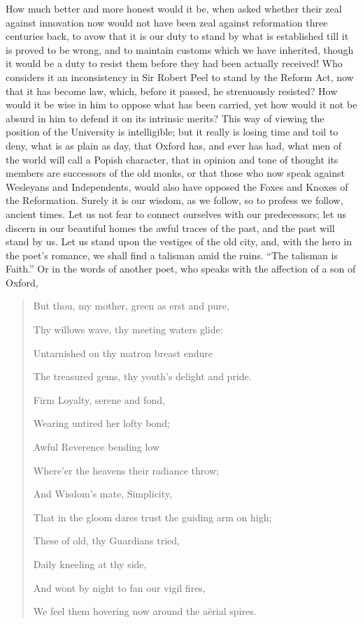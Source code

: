 How much better and more
honest would it be, when asked whether their zeal against
innovation now would not have been zeal against reformation three
centuries back, to avow that it is our duty to stand by what is
established till it is proved to be wrong, and to maintain customs
which we have inherited, though it would be a duty to resist them
before they had been actually received! Who considers it an
inconsistency in Sir Robert Peel to stand by the Reform Act, now that
it has become law, which, before it passed, he strenuously resisted?
How would it be wise in him to oppose what has been carried, yet how
would it not be absurd in him to defend it on its intrinsic merits?
This way of viewing the position of the University is intelligible;
but it really is losing time and toil to deny, what is as plain as
day, that Oxford has, and ever has had, what men of the world will
call a Popish character, that in opinion and tone of thought its
members are successors of the old monks, or that those who now speak
against Wesleyans and Independents, would also have opposed the Foxes
and Knoxes of the Reformation. Surely it is our wisdom, as we follow,
so to profess we follow, ancient times. Let us not fear to connect
ourselves with our predecessors; let us discern in our beautiful homes
the awful traces of the past, and the past will stand by us. Let us
stand upon the vestiges of the old city, and, with the hero in the
poet's romance, we shall find a talisman amid the ruins. ``The talisman
is Faith.'' Or in the words of another poet, who speaks with the
affection of a son of Oxford,

\begin{quote}

But thou, my mother, green
as erst and pure,

Thy willows wave, thy meeting
waters glide:

Untarnished on thy matron breast endure

The
treasured gems, thy youth's delight and pride. 

Firm
Loyalty, serene and fond,

Wearing untired her lofty bond;

Awful
Reverence bending low

Where'er
the heavens their radiance throw;

And
Wisdom's mate, Simplicity,

That in the gloom dares trust the guiding arm on high;

These
of old, thy Guardians tried,

Daily
kneeling at thy side,

And wont by night to fan our vigil fires,

We feel them hovering now around the aërial spires.

\end{quote}

